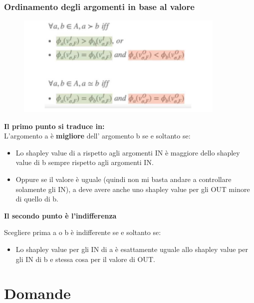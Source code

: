 \subsection{Ordinamento degli argomenti in base al valore}
\begin{figure}[htp]
	\centering
    \includegraphics[width=10cm, keepaspectratio]{img/Cap8/ordinamento-valore.png}
\end{figure}
\textbf{Il primo punto si traduce in:}
\\L’argomento a è \textbf{migliore} dell’ argomento b se e soltanto se:
\begin{itemize}
    \item Lo shapley value di a rispetto agli argomenti IN è maggiore dello shapley value di b sempre rispetto agli argomenti IN.
    \item Oppure se il valore è uguale (quindi non mi basta andare a controllare solamente gli IN), a deve avere anche uno shapley value per gli OUT minore di quello di b.
\end{itemize}
\begin{center}
     \textbf{Il secondo punto è l’indifferenza}
\end{center}
 Scegliere prima a o b è indifferente se e soltanto se:
\begin{itemize}
    \item Lo shapley value per gli IN di a è esattamente uguale allo shapley value per gli IN di b e stessa cosa per il valore di OUT. 
\end{itemize}
\chapter{Domande} \label{Domande}
